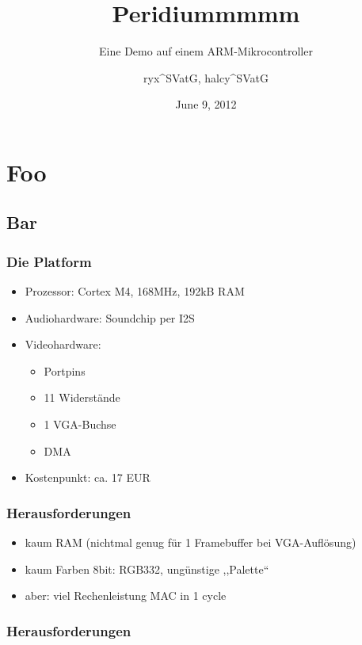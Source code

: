 \documentclass[t,14pt,aspectratio=169]{beamer}
\title{Peridiummmmm}
\subtitle{Eine Demo auf einem ARM-Mikrocontroller}
\author{ryx{\textasciicircum}SVatG, halcy{\textasciicircum}SVatG}
\begin{document}

\date{June 9, 2012}

\begin{frame} %
\titlepage
\end{frame}


\section{Foo}
\subsection{Bar}

\begin{frame} %
\frametitle{Die Platform}
\begin{itemize}
\item Prozessor: Cortex M4, 168MHz, 192kB RAM
\item Audiohardware: Soundchip per I2S
\item Videohardware: 
\begin{itemize}
\item Portpins
\item 11 Widerstände
\item 1 VGA-Buchse
\item DMA

\end{itemize}
\item Kostenpunkt: ca. 17 EUR
\end{itemize}
\end{frame}

\begin{frame}
\frametitle{Herausforderungen}
\begin{itemize}
\item kaum RAM {\small(nichtmal genug für 1 Framebuffer bei VGA-Auflösung)}
\item kaum Farben {\small 8bit: RGB332, ungünstige ,,Palette``}

\item aber: viel Rechenleistung {\small MAC in 1 cycle }


\end{itemize}
\end{frame}


\begin{frame}
\frametitle{Herausforderungen}
\begin{itemize}



\end{itemize}
\end{frame}
\end{document}
